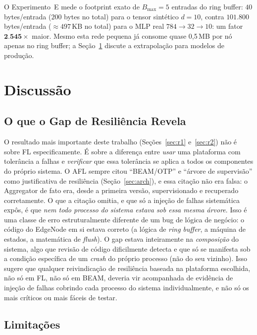 \documentclass[conference,a4paper]{IEEEtran}
\begin{document}
O Experimento~E mede o footprint exato de $B_{\max}=5$ entradas do ring
buffer: $40$ bytes/entrada ($200$ bytes no total) para o tensor sintético
$d=10$, contra $101{.}800$ bytes/entrada ($\approx 497$\,KB no total) para o
MLP real $784\!\to\!32\!\to\!10$: um fator $\mathbf{2{.}545\times}$ maior.
Mesmo esta rede pequena já consome quase 0,5\,MB por nó apenas no ring
buffer; a Seção~\ref{sec:discussion} discute a extrapolação para modelos de
produção.

\section{Discussão}
\label{sec:discussion}

\subsection{O que o Gap de Resiliência Revela}
\label{sec:discussion_gap}

O resultado mais importante deste trabalho (Seções~\ref{sec:r1}
e~\ref{sec:r2}) não é sobre FL especificamente. É sobre a diferença
entre \emph{usar} uma plataforma com tolerância a falhas e \emph{verificar}
que essa tolerância se aplica a todos os componentes do próprio sistema. O
AFL sempre citou ``BEAM/OTP'' e ``árvore de supervisão'' como justificativa
de resiliência (Seção~\ref{sec:arch}), e essa citação não era falsa: o
Aggregator de fato era, desde a primeira versão, supervisionado e
recuperado corretamente. O que a citação omitia, e que só a injeção de
falhas sistemática expôs, é que \emph{nem todo processo do sistema estava
sob essa mesma árvore}. Isso é uma classe de erro estruturalmente diferente
de um bug de lógica de negócio: o código do EdgeNode em si estava correto
(a lógica de \textit{ring buffer}, a máquina de estados,
a matemática de \textit{flush}). O gap estava inteiramente na
\emph{composição} do sistema, algo que revisão de código dificilmente
detecta e que só se manifesta sob a condição específica de um \textit{crash}
do próprio processo (não do seu vizinho). Isso sugere que qualquer
reivindicação de resiliência baseada na plataforma escolhida, não só em
FL, não só em BEAM, deveria vir acompanhada de evidência de injeção de
falhas cobrindo cada processo do sistema individualmente, e não só os
mais críticos ou mais fáceis de testar.

\subsection{Limitações}
\end{document}
